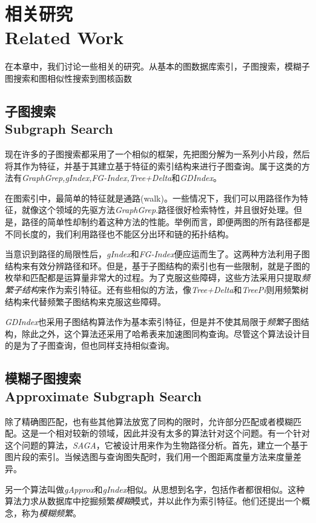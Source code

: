 \documentclass{article}
\begin{document}
\else

\fi
\chapter{相关研究 \\ Related Work}
在本章中，我们讨论一些相关的研究。从基本的图数据库索引，子图搜索，模糊子图搜索和图相似性搜索到图核函数
\section{子图搜索 \\ Subgraph Search}
现在许多的子图搜索都采用了一个相似的框架，先把图分解为一系列小片段，然后将其作为特征，并基于其建立基于特征的索引结构来进行子图查询。属于这类的方法有\emph{GraphGrep,gIndex,FG-Index,Tree+Delta}和\emph{GDIndex}。

在图索引中，最简单的特征就是通路(walk)。一些情况下，我们可以用路径作为特征，就像这个领域的先驱方法\emph{GraphGrep}.路径很好检索特性，并且很好处理。但是，路径的简单性却制约着这种方法的性能。举例而言，即便两图的所有路径都是不同长度的，我们利用路径也不能区分出环和链的拓扑结构。

当意识到路径的局限性后，\emph{gIndex}和\emph{FG-Index}便应运而生了。这两种方法利用子图结构来有效分辨路径和环。但是，基于子图结构的索引也有一些限制，就是子图的枚举和匹配都是运算量非常大的过程。为了克服这些障碍，这些方法采用只提取\emph{频繁子结构}来作为索引特征。还有些相似的方法，像\emph{Tree+Delta}和\emph{TreePi}则用频繁树结构来代替频繁子图结构来克服这些障碍。

\emph{GDIndex}也采用子图结构算法作为基本索引特征，但是并不使其局限于\emph{频繁}子图结构，除此之外，这个算法还采用了哈希表来加速图同构查询。尽管这个算法设计目的是为了子图查询，但也同样支持相似查询。

\section{模糊子图搜索 \\ Approximate Subgraph Search}
除了精确图匹配，也有些其他算法放宽了同构的限时，允许部分匹配或者模糊匹配。这是一个相对较新的领域，因此并没有太多的算法针对这个问题。有一个针对这个问题的算法，\emph{SAGA}，它被设计用来作为生物路径分析。首先，建立一个基于图片段的索引。当候选图与查询图失配时，我们用一个图距离度量方法来度量差异。

另一个算法叫做\emph{gApprox}和\emph{gIndex}相似。从思想到名字，包括作者都很相似。这种算法力求从数据库中挖掘频繁\emph{模糊}模式，并以此作为索引特征。他们还提出一个概念，称为\emph{模糊频繁}。
\end{document}

